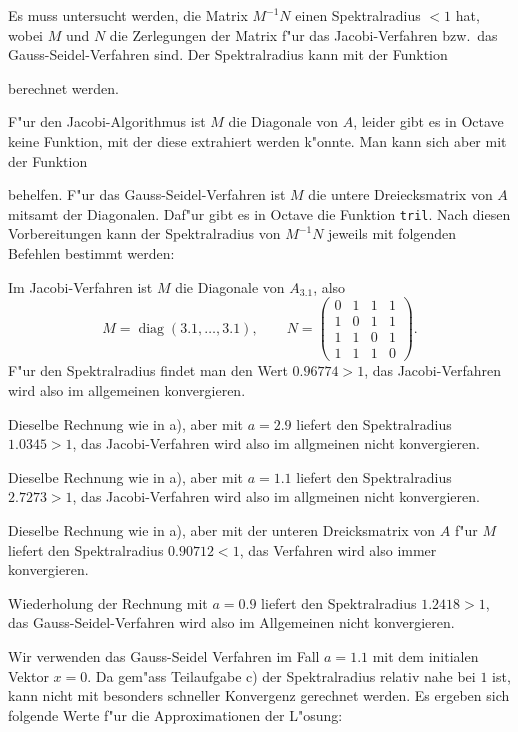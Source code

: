 \begin{loesung}
Es muss untersucht werden, die Matrix $M^{-1}N$ einen Spektralradius $<1$
hat, wobei $M$ und $N$ die Zerlegungen der Matrix f"ur das Jacobi-Verfahren
bzw.~das Gauss-Seidel-Verfahren sind.
Der Spektralradius kann mit der Funktion

berechnet werden.

F"ur den Jacobi-Algorithmus ist $M$ die Diagonale von $A$, leider gibt es
in Octave keine Funktion, mit der diese extrahiert werden k"onnte. Man kann
sich aber mit der Funktion

behelfen.
F"ur das Gauss-Seidel-Verfahren ist $M$ die untere Dreiecksmatrix von $A$
mitsamt der Diagonalen. Daf"ur gibt es in Octave die Funktion {\tt tril}.
Nach diesen Vorbereitungen kann der Spektralradius von $M^{-1}N$ jeweils
mit folgenden Befehlen bestimmt werden:

\begin{teilaufgaben}
\item Im Jacobi-Verfahren ist $M$ die Diagonale von $A_{3.1}$, also
\[
M=\operatorname{diag}(3.1,\dots,3.1),\qquad
N=
\begin{pmatrix}
0&1&1&1\\
1&0&1&1\\
1&1&0&1\\
1&1&1&0
\end{pmatrix}.
\]
F"ur den Spektralradius findet man den Wert $0.96774>1$, das Jacobi-Verfahren
wird also im allgemeinen konvergieren.
\item Dieselbe Rechnung wie in a), aber mit $a=2.9$ liefert den Spektralradius
$1.0345>1$, das Jacobi-Verfahren wird also im allgmeinen nicht 
konvergieren.
\item Dieselbe Rechnung wie in a), aber mit $a=1.1$ liefert den Spektralradius
$2.7273>1$, das Jacobi-Verfahren wird also im allgmeinen nicht 
konvergieren.
\item Dieselbe Rechnung wie in a), aber mit der unteren Dreicksmatrix von $A$
f"ur $M$ liefert den Spektralradius $0.90712 < 1$, das Verfahren wird also
immer konvergieren.
\item
Wiederholung der Rechnung mit $a=0.9$ liefert den Spektralradius $1.2418>1$,
das Gauss-Seidel-Verfahren wird also im Allgemeinen nicht konvergieren.
\item Wir verwenden das Gauss-Seidel Verfahren im Fall $a=1.1$ mit dem
initialen Vektor $x=0$. Da gem"ass Teilaufgabe c) der Spektralradius relativ
nahe bei $1$ ist, kann nicht mit besonders schneller Konvergenz gerechnet
werden. 
Es ergeben sich folgende Werte f"ur die Approximationen der L"osung:

\end{teilaufgaben}
\end{loesung}
